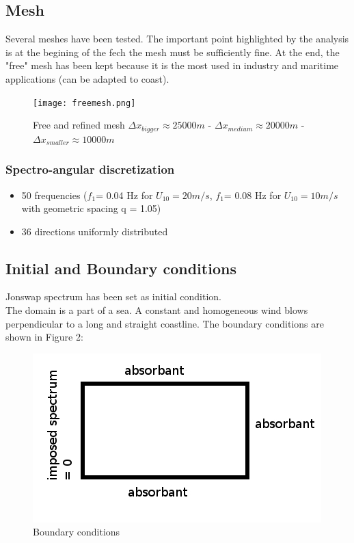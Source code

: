 \documentclass[10pt]{article}
\begin{document}
\subsection{Mesh}
Several meshes have been tested. The important point highlighted by the
analysis is at the begining of the fech the mesh must be sufficiently fine.
At the end, the "free" mesh has been kept because it is the most used in
industry and maritime applications (can be adapted to coast).
\quad \vspace{3cm}
\begin{figure}[H]
  \centering
    \texttt{[image: freemesh.png]}
    \caption{Free and refined mesh $\Delta x_{bigger} \approx 25 000 m$ -
      $\Delta x_{medium} \approx 20 000 m$ - $\Delta x_{smaller} \approx 10 000 m$}
\end{figure}

\subsubsection{Spectro-angular discretization}
\begin{itemize}
\item 50 frequencies ($f_1 $= 0.04 Hz for $U_{10} = 20m/s$, $f_1 $= 0.08 Hz for
  $U_{10} = 10m/s$ with geometric spacing q = 1.05)
\item 36 directions uniformly distributed
\end{itemize}

\subsection{Initial and Boundary conditions}
Jonswap spectrum has been set as initial condition.\\
The domain is a part of a sea. A constant and homogeneous wind blows
perpendicular to a long and straight coastline. The boundary conditions are
shown in Figure 2:
\begin{figure}
\centering
\includegraphics[scale=0.5]{boundarycond.jpg}
\caption{Boundary conditions}
\end{figure}
\end{document}
